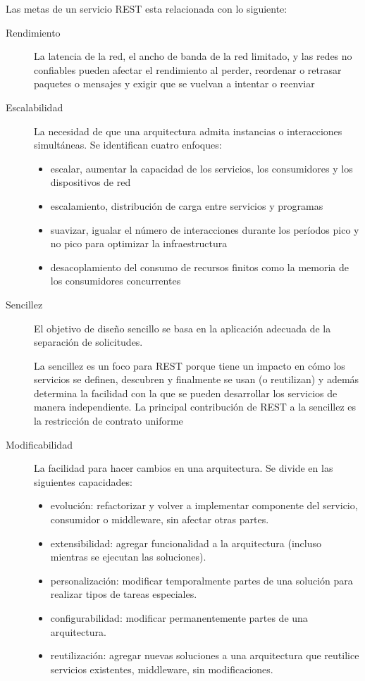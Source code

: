 		Las metas de un servicio REST esta relacionada con lo siguiente:
	\begin{description}
		\item[Rendimiento] La latencia de la red, el ancho de banda de la red limitado,  y las redes no confiables pueden afectar el rendimiento al perder, reordenar o retrasar paquetes o mensajes y exigir que se vuelvan a intentar o reenviar
		
		\item[Escalabilidad]   La necesidad de que una arquitectura admita instancias o interacciones simultáneas. 
		Se identifican cuatro enfoques:
			 \begin{itemize}
				\item escalar, aumentar la capacidad de los servicios, los consumidores y los dispositivos de red
				\item escalamiento, distribución de carga entre servicios y programas
				\item suavizar,  igualar el número de interacciones durante los períodos pico y no pico para optimizar la infraestructura
				\item desacoplamiento del consumo de recursos finitos como la memoria de los consumidores concurrentes	  			
			\end{itemize}
			
		\item[Sencillez]  El objetivo de diseño sencillo se basa en la 	aplicación adecuada de la separación de solicitudes.
			
		  La sencillez es un foco para REST porque tiene un impacto en cómo los servicios se definen, descubren y finalmente se usan (o reutilizan) y además determina la facilidad con la que se pueden desarrollar los servicios de manera independiente.  			
		  La principal contribución de REST a la sencillez es la restricción de contrato uniforme  			
 
		\item[Modificabilidad] La facilidad para hacer cambios en una arquitectura.
		Se divide en las siguientes capacidades:
		\begin{itemize}
			\item 	evolución: refactorizar y volver a implementar componente del servicio, consumidor o middleware, sin afectar otras partes. 
			\item extensibilidad: agregar funcionalidad a la arquitectura (incluso mientras se ejecutan las soluciones).   
			\item personalización: modificar temporalmente partes de una solución para realizar tipos de tareas especiales.
			\item configurabilidad: modificar permanentemente partes de una arquitectura.
			\item reutilización:  agregar nuevas soluciones a una arquitectura que reutilice servicios existentes, middleware, sin modificaciones.			
		\end{itemize}
		

\end{description}
